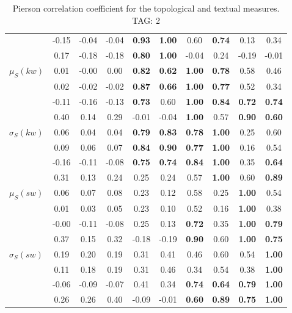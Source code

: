\begin{table*}[h!]
\begin{center}
\begin{tabular}{| l || c | c | c | c | c | c | c | c | c |}
 & -0.15 & -0.04 & -0.04 & {\bf 0.93} & {\bf 1.00} & 0.60 & {\bf 0.74} & 0.13 & 0.34 \\
 & 0.17 & -0.18 & -0.18 & {\bf 0.80} & {\bf 1.00} & -0.04 & 0.24 & -0.19 & -0.01 \\\hline
$\mu_S(kw)$ & 0.01 & -0.00 & 0.00 & {\bf 0.82} & {\bf 0.62} & {\bf 1.00} & {\bf 0.78} & 0.58 & 0.46 \\
 & 0.02 & -0.02 & -0.02 & {\bf 0.87} & {\bf 0.66} & {\bf 1.00} & {\bf 0.77} & 0.52 & 0.34 \\
 & -0.11 & -0.16 & -0.13 & {\bf 0.73} & 0.60 & {\bf 1.00} & {\bf 0.84} & {\bf 0.72} & {\bf 0.74} \\
 & 0.40 & 0.14 & 0.29 & -0.01 & -0.04 & {\bf 1.00} & 0.57 & {\bf 0.90} & {\bf 0.60} \\\hline
$\sigma_S(kw)$ & 0.06 & 0.04 & 0.04 & {\bf 0.79} & {\bf 0.83} & {\bf 0.78} & {\bf 1.00} & 0.25 & 0.60 \\
 & 0.09 & 0.06 & 0.07 & {\bf 0.84} & {\bf 0.90} & {\bf 0.77} & {\bf 1.00} & 0.16 & 0.54 \\
 & -0.16 & -0.11 & -0.08 & {\bf 0.75} & {\bf 0.74} & {\bf 0.84} & {\bf 1.00} & 0.35 & {\bf 0.64} \\
 & 0.31 & 0.13 & 0.24 & 0.25 & 0.24 & 0.57 & {\bf 1.00} & 0.60 & {\bf 0.89} \\\hline
$\mu_S(sw)$ & 0.06 & 0.07 & 0.08 & 0.23 & 0.12 & 0.58 & 0.25 & {\bf 1.00} & 0.54 \\
 & 0.01 & 0.03 & 0.05 & 0.23 & 0.10 & 0.52 & 0.16 & {\bf 1.00} & 0.38 \\
 & -0.00 & -0.11 & -0.08 & 0.25 & 0.13 & {\bf 0.72} & 0.35 & {\bf 1.00} & {\bf 0.79} \\
 & 0.37 & 0.15 & 0.32 & -0.18 & -0.19 & {\bf 0.90} & 0.60 & {\bf 1.00} & {\bf 0.75} \\\hline
$\sigma_S(sw)$ & 0.19 & 0.20 & 0.19 & 0.31 & 0.41 & 0.46 & 0.60 & 0.54 & {\bf 1.00} \\
 & 0.11 & 0.18 & 0.19 & 0.31 & 0.46 & 0.34 & 0.54 & 0.38 & {\bf 1.00} \\
 & -0.06 & -0.09 & -0.07 & 0.41 & 0.34 & {\bf 0.74} & {\bf 0.64} & {\bf 0.79} & {\bf 1.00} \\
 & 0.26 & 0.26 & 0.40 & -0.09 & -0.01 & {\bf 0.60} & {\bf 0.89} & {\bf 0.75} & {\bf 1.00} \\\hline
\end{tabular}
\caption{Pierson correlation coefficient for the topological and textual measures. TAG: 2}
\end{center}
\end{table*}